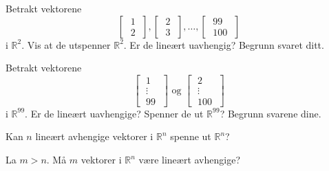 \begin{oppgave}
\begin{punkt}
Betrakt vektorene
\[ 
\begin{bmatrix} \;1\; \\ \;2\; \end{bmatrix}, 
\begin{bmatrix} \;2\; \\ \;3\; \end{bmatrix}, \dots, 
\begin{bmatrix} \;99\; \\ \;100\; \end{bmatrix}
\]
i $\mathbb{R}^2$. Vis at de utspenner $\mathbb{R}^2$. Er de lineært uavhengig? Begrunn svaret ditt.
\end{punkt}

\begin{punkt}
Betrakt vektorene
\[ 
\begin{bmatrix} 
\;1\; \\ 
\;\vdots\; \\ 
\;99\; 
\end{bmatrix}
\text{ og }
\begin{bmatrix} 
\;2\; \\ 
\;\vdots\; \\ 
\;100\; 
\end{bmatrix}
\]
i $\mathbb{R}^{99}$. Er de lineært uavhengige? Spenner de ut $\mathbb{R}^{99}$? Begrunn svarene dine.

\end{punkt}
\end{oppgave}

\begin{oppgave}
	Kan $n$ lineært avhengige vektorer i $\mathbb{R}^n$ spenne ut $\mathbb{R}^n$? 
\end{oppgave}

\begin{oppgave}
	La $m>n$. Må $m$ vektorer i $\mathbb{R}^n$ være lineært avhengige? 
\end{oppgave}
